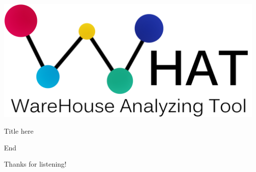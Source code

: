 \documentclass[xcolor=dvipsnames]{beamer}
\begin{document}

\begin{frame}
\begin{center}
\includegraphics[width =0.7\linewidth]{Pictures/WHAT-Logo2.png}
\end{center}

\end{frame}
% 



\begin{frame}{Title here}


\end{frame}




\begin{frame}{End}

\begin{center}
\huge{Thanks for listening!}
\end{center}


\end{frame}  


\end{document}
